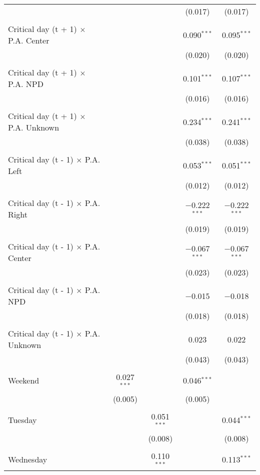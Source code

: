 \documentclass[
]{article}
\begin{document}
\begin{table}[!htbp]
{\begin{tabular}{@{\extracolsep{5pt}}lcccc}
  &  &  & (0.017) & (0.017) \\ 
  & & & & \\ 
 Critical day (t + 1) $\times$ P.A. Center &  &  & 0.090$^{***}$ & 0.095$^{***}$ \\ 
  &  &  & (0.020) & (0.020) \\ 
  & & & & \\ 
 Critical day (t + 1) $\times$ P.A. NPD &  &  & 0.101$^{***}$ & 0.107$^{***}$ \\ 
  &  &  & (0.016) & (0.016) \\ 
  & & & & \\ 
 Critical day (t + 1) $\times$ P.A. Unknown &  &  & 0.234$^{***}$ & 0.241$^{***}$ \\ 
  &  &  & (0.038) & (0.038) \\ 
  & & & & \\ 
 Critical day (t - 1) $\times$ P.A. Left &  &  & 0.053$^{***}$ & 0.051$^{***}$ \\ 
  &  &  & (0.012) & (0.012) \\ 
  & & & & \\ 
 Critical day (t - 1) $\times$ P.A. Right &  &  & $-$0.222$^{***}$ & $-$0.222$^{***}$ \\ 
  &  &  & (0.019) & (0.019) \\ 
  & & & & \\ 
 Critical day (t - 1) $\times$ P.A. Center &  &  & $-$0.067$^{***}$ & $-$0.067$^{***}$ \\ 
  &  &  & (0.023) & (0.023) \\ 
  & & & & \\ 
 Critical day (t - 1) $\times$ P.A. NPD &  &  & $-$0.015 & $-$0.018 \\ 
  &  &  & (0.018) & (0.018) \\ 
  & & & & \\ 
 Critical day (t - 1) $\times$ P.A. Unknown &  &  & 0.023 & 0.022 \\ 
  &  &  & (0.043) & (0.043) \\ 
  & & & & \\ 
 Weekend & 0.027$^{***}$ &  & 0.046$^{***}$ &  \\ 
  & (0.005) &  & (0.005) &  \\ 
  & & & & \\ 
 Tuesday &  & 0.051$^{***}$ &  & 0.044$^{***}$ \\ 
  &  & (0.008) &  & (0.008) \\ 
  & & & & \\ 
 Wednesday &  & 0.110$^{***}$ &  & 0.113$^{***}$ \\ 

\end{tabular}}
\end{table}
\end{document}
